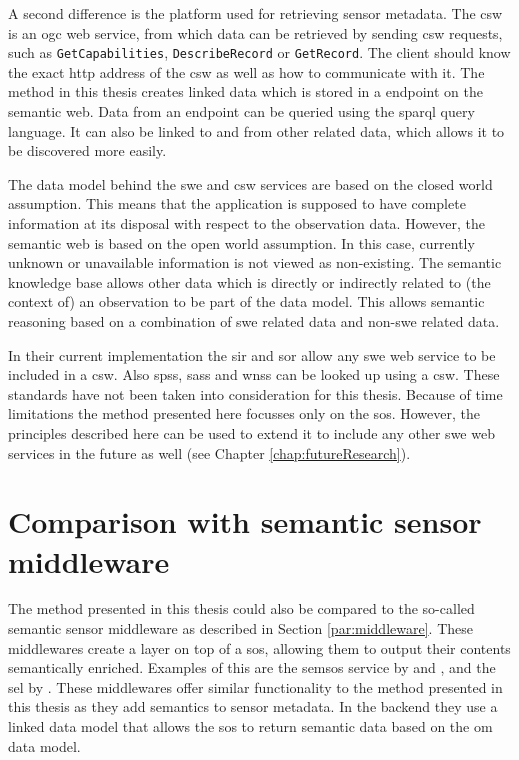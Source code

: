 A second difference is the platform used for retrieving sensor metadata. The \ac{csw} is an \ac{ogc} web service, from which data can be retrieved by sending \ac{csw} requests, such as \texttt{GetCapabilities}, \texttt{DescribeRecord} or \texttt{GetRecord}. The client should know the exact \ac{http} address of the \ac{csw} as well as how to communicate with it. The method in this thesis creates linked data which is stored in a endpoint on the semantic web. Data from an endpoint can be queried using the \ac{sparql} query language. It can also be linked to and from other related data, which allows it to be discovered more easily.    

The data model behind the \ac{swe} and \ac{csw} services are based on the closed world assumption. This means that the application is supposed to have complete information at its disposal with respect to the observation data. However, the semantic web is based on the open world assumption. In this case, currently unknown or unavailable information is not viewed as non-existing. The semantic knowledge base allows other data which is directly or indirectly related to (the context of) an observation to be part of the data model. This allows semantic reasoning based on a combination of \ac{swe} related data and non-\ac{swe} related data.       

In their current implementation the \ac{sir} and \ac{sor} allow any \ac{swe} web service to be included in a \ac{csw}. Also \aclp{sps}, \aclp{sas} and \aclp{wns} can be looked up using a \ac{csw}. These standards have not been taken into consideration for this thesis. Because of time limitations the method presented here focusses only on the \ac{sos}. However, the principles described here can be used to extend it to include any other \ac{swe} web services in the future as well (see Chapter \ref{chap:futureResearch}).        

\section{Comparison with semantic sensor middleware}
\label{compareSSM}
The method presented in this thesis could also be compared to the so-called semantic sensor middleware as described in Section \ref{par:middleware}. These middlewares create a layer on top of a \ac{sos}, allowing them to output their contents semantically enriched. Examples of this are the \acf{semsos} service by \cite{SSW:Henson} and \cite{SSW:Pschorr}, and the \acf{sel} by \cite{SSW:Janowicz}. These middlewares offer similar functionality to the method presented in this thesis as they add semantics to sensor metadata. In the backend they use a linked data model that allows the \ac{sos} to return semantic data based on the \ac{om} data model. 

